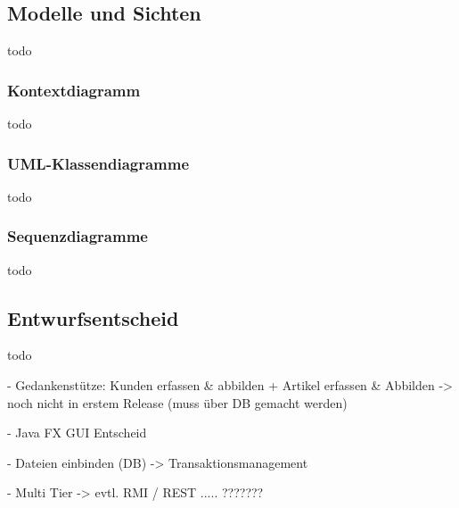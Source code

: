 \subsection{Modelle und Sichten}
todo


\subsubsection{Kontextdiagramm}
todo

\subsubsection{UML-Klassendiagramme}
todo


\subsubsection{Sequenzdiagramme}
todo


\subsection{Entwurfsentscheid}
todo

- Gedankenstütze: Kunden erfassen \& abbilden + Artikel erfassen \& Abbilden -> noch nicht in erstem Release 
(muss über DB gemacht werden)

- Java FX GUI Entscheid

- Dateien einbinden (DB) -> Transaktionsmanagement

- Multi Tier -> evtl. RMI / REST .....   ???????

